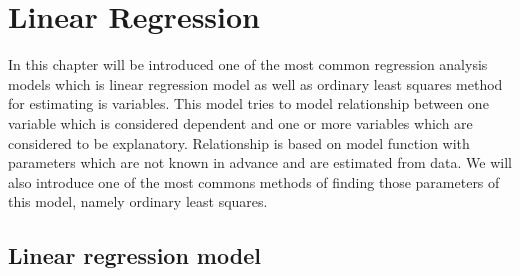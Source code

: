 \chapter{Linear Regression}
In this chapter will be introduced one of the most common regression analysis models which is linear regression model as well as ordinary least squares method for estimating is variables. This model tries to model relationship between one variable which is considered dependent and one or more variables which are considered to be explanatory. Relationship is based on model function with parameters which are not known in advance and are estimated from data. We will also introduce one of the most commons methods of finding those parameters of this model, namely ordinary least squares.
\section{Linear regression model}
